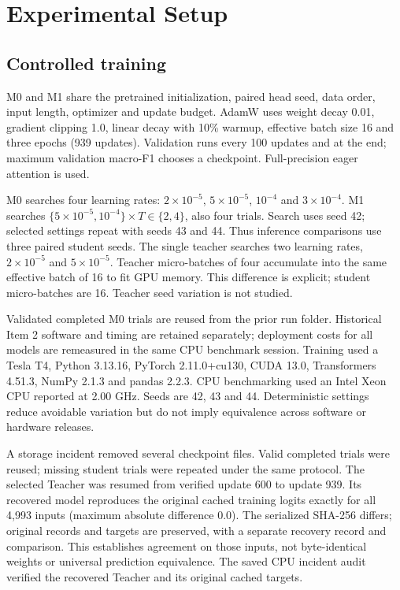 \documentclass[11pt]{article}
\begin{document}
\section{Experimental Setup}
\subsection{Controlled training}
M0 and M1 share the pretrained initialization, paired head seed, data order, input length, optimizer and update budget. AdamW uses weight decay 0.01, gradient clipping 1.0, linear decay with 10\% warmup, effective batch size 16 and three epochs (939 updates). Validation runs every 100 updates and at the end; maximum validation macro-F1 chooses a checkpoint. Full-precision eager attention is used.

M0 searches four learning rates: $2\times10^{-5}$, $5\times10^{-5}$, $10^{-4}$ and $3\times10^{-4}$. M1 searches $\{5\times10^{-5},10^{-4}\}\times T\in\{2,4\}$, also four trials. Search uses seed 42; selected settings repeat with seeds 43 and 44. Thus inference comparisons use three paired student seeds. The single teacher searches two learning rates, $2\times10^{-5}$ and $5\times10^{-5}$. Teacher micro-batches of four accumulate into the same effective batch of 16 to fit GPU memory. This difference is explicit; student micro-batches are 16. Teacher seed variation is not studied.

Validated completed M0 trials are reused from the prior run folder. Historical Item 2 software and timing are retained separately; deployment costs for all models are remeasured in the same CPU benchmark session. Training used a Tesla T4, Python 3.13.16, PyTorch 2.11.0+cu130, CUDA 13.0, Transformers 4.51.3, NumPy 2.1.3 and pandas 2.2.3. CPU benchmarking used an Intel Xeon CPU reported at 2.00 GHz. Seeds are 42, 43 and 44. Deterministic settings reduce avoidable variation but do not imply equivalence across software or hardware releases.

A storage incident removed several checkpoint files. Valid completed trials were reused; missing student trials were repeated under the same protocol. The selected Teacher was resumed from verified update 600 to update 939. Its recovered model reproduces the original cached training logits exactly for all 4,993 inputs (maximum absolute difference 0.0). The serialized SHA-256 differs; original records and targets are preserved, with a separate recovery record and comparison. This establishes agreement on those inputs, not byte-identical weights or universal prediction equivalence. The saved CPU incident audit verified the recovered Teacher and its original cached targets.
\end{document}
